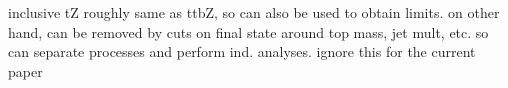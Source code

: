 \documentclass[preprint]{JHEP3} %
\begin{document}
inclusive tZ roughly same as ttbZ, so can also be used to obtain limits. on other hand, can be removed by cuts on final state around top mass, jet mult, etc. so can separate processes and perform ind. analyses. ignore this for the current paper

\end{document}
